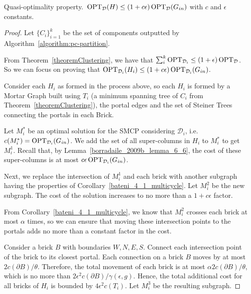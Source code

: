 \begin{flemma}\label{spanner_quasi_optimality_property}
    Quasi-optimality property.~\(\operatorname{\textrm{OPT}}_{\mathcal{D}}(H) \leq (1 + c \epsilon) \operatorname{\textrm{OPT}}_{\mathcal{D}}(G_{in})\) with \(c\) and \(\epsilon\) constants.
\end{flemma}
\begin{proof}

    Let \(\{C_i\}_{i=1}^k\) be the set of components outputted by Algorithm~\ref{algorithm:pc-partition}.

    From Theorem~\ref{theoremClustering}, we have that \(\sum_{i}^k \operatorname{\textrm{OPT}}_{\mathcal{D}_i} \leq (1 + \epsilon) \operatorname{\textrm{OPT}}_{\mathcal{D}}\). So we can focus on proving that \(\operatorname{\textrm{OPT}}_{\mathcal{D}_i}(H_i) \leq (1 + c \epsilon) \operatorname{\textrm{OPT}}_{\mathcal{D}_i}(G_{in})\).

    Consider each \(H_i\) as formed in the process above, so each \(H_i\) is formed by a Mortar Graph built using \(T_i\) (a minimum spanning tree of \(C_i\) from Theorem~\ref{theoremClustering}), the portal edges and the set of Steiner Trees connecting the portals in each Brick.

    Let \(M^\ast_i\) be an optimal solution for the SMCP considering \(\mathcal{D}_i\), i.e. \(c(M^\ast_i) = \operatorname{\textrm{OPT}}_{\mathcal{D}_i}(G_{in})\). We add the set of all super-columns in \(H_i\) to \(M^\ast_i\) to get \(M^1_i\). Recall that, by Lemma~\ref{borradaile_2009b_lemma_6_6}, the cost of these super-columns is at most \(c \epsilon \operatorname{\textrm{OPT}}_{\mathcal{D}_i}(G_{in})\).

    Next, we replace the intersection of \(M_i^1\) and each brick with another subgraph having the properties of  Corollary~\ref{bateni_4_1_multicycle}. Let \(M_i^2\) be the new subgraph. The cost of the solution increases to no more than a \(1 + c \epsilon\) factor.

    From  Corollary~\ref{bateni_4_1_multicycle}, we know that \(M_i^2\) crosses each brick at most \(\alpha\) times, so we can ensure that moving these intersection points to the portals adds no more than a constant factor in the cost.

    Consider a brick \(B\) with boundaries \(W, N, E, S\). Connect each intersection point of the brick to its closest portal. Each connection on a brick \(B\) moves by at most \(2 c(\partial B) / \theta\). Therefore, the total movement of each brick is at most \(\alpha 2 c(\partial B) / \theta\), which is no more than \(2 \epsilon^2 c(\partial B) / \gamma(\epsilon, g)\). Hence, the total additional cost for all bricks of \(H_i\) is bounded by \(4 \epsilon^2 c(T_i)\). Let \(M_i^3\) be the resulting subgraph.


\end{proof}
